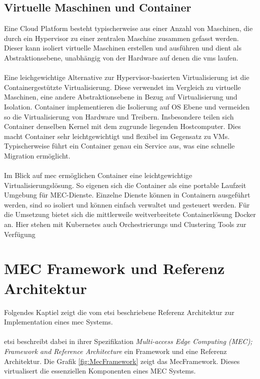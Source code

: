 \documentclass[runningheads]{llncs}
\numberwithin{figure}{section}
\begin{document}
\subsection{Virtuelle Maschinen und Container}
\label{subsec:Virtuelle Maschinen und Container}
Eine Cloud Platform besteht typischerweise aus einer Anzahl von Maschinen, 
die durch ein Hypervisor zu einer zentralen Maschine zusammen gefasst werden.
Dieser kann isoliert virtuelle Maschinen erstellen und ausführen und dient als Abstraktionsebene, 
unabhängig von der Hardware auf denen die \acrshort{vm}s laufen.
\\
\\
Eine leichgewichtige Alternative zur Hypervisor-basierten Virtualisierung ist die Containergestützte Virtualisierung. 
Diese verwendet im Vergleich zu virtuelle Maschinen, eine andere Abstraktionsebene in Bezug auf Virtualisierung und Isolation. 
Container implementieren die Isolierung auf OS Ebene und vermeiden so die Virtualisierung von Hardware und Treibern. 
Insbesondere teilen sich Container denselben Kernel mit dem zugrunde liegenden Hostcomputer. 
Dies macht Container sehr leichtgewichtigt und flexibel im 
Gegensatz zu VMs. Typischerweise führt ein Container genau ein Service aus, was eine schnelle Migration ermöglicht.
\\
\\
Im Blick auf \acrshort{mec} ermöglichen Container eine leichtgewichtige Virtualisierungslösung. So eigenen sich die Container
als eine portable Laufzeit Umgebung für MEC-Dienste. 
Einzelne Dienste können in Containern ausgeführt werden, sind so isoliert und können einfach 
verwaltet und gesteuert werden. Für die Umsetzung bietet sich die mittlerweile weitverbreitete Containerlösung Docker an. Hier stehen mit 
Kubernetes auch Orchestrierungs und Clustering Tools zur Verfügung \cite{morabitoConsolidateIoTEdge2018}



\newpage
\section{MEC Framework und Referenz Architektur}
\label{subsec:MEC Framework - Referenz Architektur}
Folgendes Kaptiel zeigt die vom \acrfull{etsi} beschriebene
Referenz Architektur zur Implementation eines \acrshort{mec} Systems. 
\\ 
\\
\acrshort{etsi} beschreibt dabei in ihrer Spezifikation \textit{Multi-access Edge Computing (MEC); 
Framework and Reference Architecture} \cite{etsiETSIGSMEC} ein Framework und eine 
Referenz Architektur. Die Grafik \ref{fig:MecFramework} zeigt das MecFramework. Dieses virtualisert die essenziellen Komponenten eines 
MEC Systems.
\end{document}
